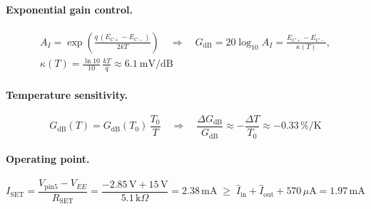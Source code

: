 \documentclass[11pt, letterpaper,titlepage]{article}
\begin{document}
\paragraph{Exponential gain control.}
\begin{equation}
    \begin{gathered}
    A_I = \exp\!\left(\frac{q\,(E_{C+}-E_{C-})}{2kT}\right)
    \quad\Longrightarrow\quad
    G_\text{dB} = 20\log_{10}A_I = \frac{E_{C+}-E_{C-}}{\kappa(T)}, \\
    \kappa(T) = \frac{\ln 10}{10}\,\frac{kT}{q} \approx 6.1\ \mathrm{mV/dB}
    \end{gathered}
    \label{eq:vca-law}
\end{equation}

\paragraph{Temperature sensitivity.}
\begin{equation}
    G_\text{dB}(T) = G_\text{dB}(T_0)\,\frac{T_0}{T}
    \quad\Longrightarrow\quad
    \frac{\Delta G_\text{dB}}{G_\text{dB}} \approx -\frac{\Delta T}{T_0} \approx -0.33\,\%/\mathrm{K}
    \label{eq:vca-tempco}
\end{equation}

\paragraph{Operating point.}
\begin{equation}
    I_\text{SET} = \frac{V_\text{pin5}-V_{EE}}{R_\text{SET}}
    = \frac{-2.85\,\mathrm{V}+15\,\mathrm{V}}{5.1\,\mathrm{k}\Omega} = 2.38\,\mathrm{mA}
    \;\geq\; \hat I_\text{in} + \hat I_\text{out} + 570\,\mu\mathrm{A} = 1.97\,\mathrm{mA}
    \label{eq:iset}
\end{equation}
\end{document}
